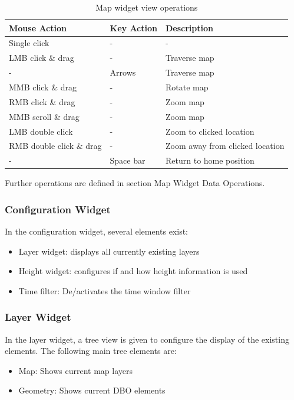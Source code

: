 \documentclass[10pt,letterpaper,extrafontsizes]{memoir}
\begin{document}
\begin{table}[H]
  \center
  \begin{tabular}{ | l | l | l |}
    \hline
    \textbf{Mouse Action} & \textbf{Key Action} &  \textbf{Description} \\ \hline
    Single click & - & - \\ \hline
    LMB click \& drag & - & Traverse map \\ \hline
    - & Arrows & Traverse map \\ \hline
    MMB click \& drag & - & Rotate map \\ \hline
    RMB click \& drag & - & Zoom map \\ \hline
    MMB scroll \& drag & - & Zoom map \\ \hline
    LMB double click & - & Zoom to clicked location \\ \hline
    RMB double click \& drag & - & Zoom away from clicked location \\ \hline
    - & Space bar & Return to home position \\ \hline
  \end{tabular}
  \caption{Map widget view operations}
\end{table}

Further operations are defined in section Map Widget Data Operations.

\subsubsection{Configuration Widget}
\label{sec:osgview_config}

In the configuration widget, several elements exist:

\begin{itemize}
 \item Layer widget: displays all currently existing layers
 \item Height widget: configures if and how height information is used
 \item Time filter: De/activates the time window filter
\end{itemize}

\subsubsection{Layer Widget}

In the layer widget, a tree view is given to configure the display of the existing elements. The following main tree elements are:
\begin{itemize}
 \item Map: Shows current map layers
 \item Geometry: Shows current DBO elements
\end{itemize}
\end{document}
